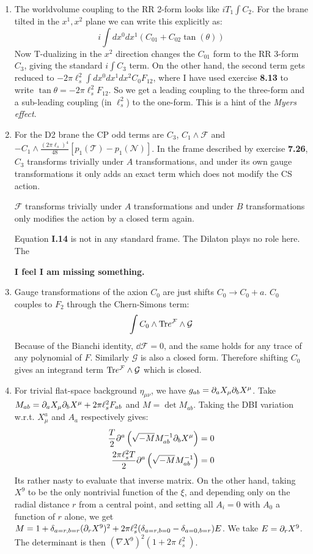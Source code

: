 \documentclass[11pt, class=article, crop=false]{standalone}
\begin{document}
\begin{enumerate}
	\item The worldvolume coupling to the RR 2-form looks like $i T_1 \int C_2$. For the brane tilted in the $x^1, x^2$ plane we can write this explicitly as:
	\[
		i \int dx^0 d x^1 (C_{01} + C_{02} \tan(\theta))
	\]
	Now T-dualizing in the $x^2$ direction changes the $C_{01}$ form to the RR 3-form $C_3$, giving the standard $i \int C_3$ term. On the other hand, the second term gets reduced to $-2 \pi \ell_s^2  \int dx^0 dx^1 dx^2 C_0 F_{12}$, where I have used exercise \textbf{8.13} to write $\tan \theta = -2\pi\ell_s^2 F_{12}$. So we get a leading coupling to the three-form and a sub-leading coupling (in $\ell_s^2$) to the one-form. This is a hint of the \emph{Myers effect}.

	\item For the D2 brane the CP odd terms are $C_3$, $C_1 \wedge \mathcal F$ and $-C_1 \wedge \frac{(2\pi \ell_s)^4}{48} [p_1(\mathcal T) - p_1(\mathcal N)]$. In the frame described by exercise \textbf{7.26}, $C_3$ transforms trivially under $A$ transformations, and under its own gauge transformations it only adds an exact term which does not modify the CS action. 
	
	$\mathcal F$ transforms trivially under $A$ transformations and under $B$ transformations only modifies the action by a closed term again. 
	
	Equation \textbf{I.14} is not in any standard frame. The Dilaton plays no role here. The 
	
	\textbf{I feel I am missing something.}
	
	\item Gauge transformations of the axion $C_0$ are just shifts $C_0 \to C_0 + a$. $C_0$ couples to $F_2$ through the Chern-Simons term:
	\[
		\int C_0 \wedge \mathrm{Tr} e^{\mathcal F} \wedge \mathcal G
	\]
	Because of the Bianchi identity, $\dd \mathcal F = 0$, and the same holds for any trace of any polynomial of $F$. Similarly $\mathcal G$ is also a closed form. Therefore shifting $C_0$ gives an integrand term $\mathrm{Tr} e^{\mathcal F} \wedge \mathcal G$ which is closed.
	
	\item For trivial flat-space background $\eta_{\mu \nu}$, we have $g_{ab} = \partial_a X_\mu \partial_b X^\mu$. Take $M_{ab} = \partial_a X_\mu \partial_b X^\mu +  2\pi \ell_s^2 F_{ab}$ and $M = \det M_{ab}$. Taking the DBI variation w.r.t. $X_\mu^a$ and $A_a$ respectively gives:
	\[
	\begin{aligned}
		\frac{T}{2} \partial^a \left( \sqrt{-M} M^{-1}_{ab} \partial_b X^\mu \right) = 0\\
		 \frac{2 \pi \ell_s^2 T}{2} \partial^a \left(\sqrt{-M} M^{-1}_{ab} \right) = 0
	\end{aligned}
	\]
	Its rather nasty to evaluate that inverse matrix. On the other hand, taking $X^9$ to be the only nontrivial function of the $\xi$, and depending only on the radial distance $r$ from a central point, and setting all $A_i = 0$ with $A_0$ a function of $r$ alone, we get $M = 1 + \delta_{a=r, b=r} (\partial_r X^9)^2 + 2 \pi \ell_s^2 (\delta_{a=r, b=0} - \delta_{a=0, b=r}) E$. We take $E = \partial_r X^9$. The determinant is then $(\nabla X^9)^2 (1 + 2\pi \ell_s^2)$. 
	

\end{enumerate}
\end{document}
